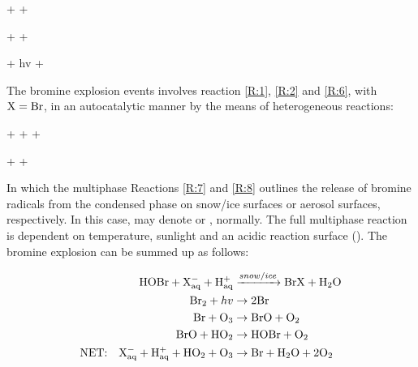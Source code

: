 \begin{reaction}
     +  \rightarrow {} + 
    \label{R:14}
\end{reaction}



\begin{reaction}
     +    + 
    \label{R:13}
\end{reaction}

\begin{reaction}
     + hv \rightarrow {} + 
    \label{R:18}
\end{reaction}


The bromine explosion events involves reaction \ref{R:1}, \ref{R:2} and \ref{R:6}, with $\mathrm{X} = \mathrm{Br}$, in an autocatalytic manner by the means of heterogeneous reactions: 

\begin{reaction}
     +  +    +  \label{R:7} 
\end{reaction}
\begin{reaction}
     +    +  \label{R:8}
\end{reaction}



In which the multiphase Reactions \ref{R:7} and \ref{R:8} outlines the release of bromine radicals from the condensed phase on snow/ice surfaces or aerosol surfaces, respectively. In this case,  may denote  or , normally. The full multiphase reaction is dependent on temperature, sunlight and an acidic reaction surface (\cite{Toyota}). The bromine explosion can be summed up as follows: 

\begin{align*}
    \mathrm{HOBr} + \mathrm{X^-_{aq}} + \mathrm{H^+_{aq}} &\xrightarrow{snow/ice} \mathrm{BrX} + \mathrm{H_2O} \\
    \mathrm{Br_2} + hv &\rightarrow 2\mathrm{Br} \\
    \mathrm{Br} + \mathrm{O_3} &\rightarrow \mathrm{BrO} + \mathrm{O_2} \\
    \mathrm{BrO} + \mathrm{HO_2} &\rightarrow \mathrm{HOBr} + \mathrm{O_2} \\
    \text{NET:} \quad \mathrm{X^-_{aq}} + \mathrm{H^+_{aq}} + \mathrm{HO_2} + \mathrm{O_3}  &\rightarrow \mathrm{Br} + \mathrm{H_2O} + 2\mathrm{O_2} 
\end{align*}

